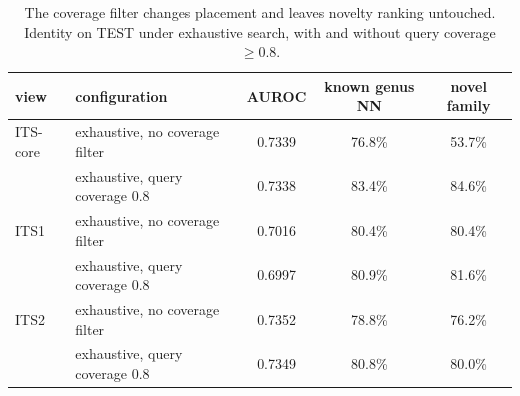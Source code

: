 \begin{table}[htbp]\centering
\begin{threeparttable}
\caption{The coverage filter changes placement and leaves novelty ranking untouched. Identity on TEST under exhaustive search, with and without query coverage $\geq0.8$.}
\label{tab:config}
\small
\begin{tabular}{llccc}
\toprule
view & configuration & AUROC & known genus NN & novel family \\
\midrule
ITS-core & exhaustive, no coverage filter & 0.7339 & 76.8\% & 53.7\% \\
 & exhaustive, query coverage 0.8 & 0.7338 & 83.4\% & 84.6\% \\
\addlinespace
ITS1 & exhaustive, no coverage filter & 0.7016 & 80.4\% & 80.4\% \\
 & exhaustive, query coverage 0.8 & 0.6997 & 80.9\% & 81.6\% \\
\addlinespace
ITS2 & exhaustive, no coverage filter & 0.7352 & 78.8\% & 76.2\% \\
 & exhaustive, query coverage 0.8 & 0.7349 & 80.8\% & 80.0\% \\
\bottomrule
\end{tabular}
\end{threeparttable}
\end{table}
